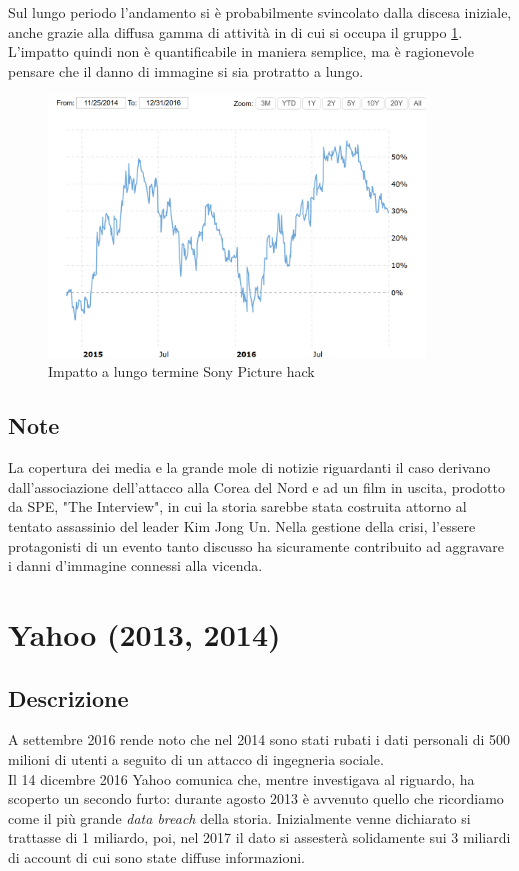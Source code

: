 \documentclass[12pt,a4paper,openright,twoside]{report}
\begin{document}
Sul lungo periodo l'andamento si \`e probabilmente svincolato dalla discesa iniziale, anche  grazie alla diffusa gamma di attivit\`a in di cui si occupa il gruppo \ref{fig:sPic2}. L'impatto quindi non \`e quantificabile in maniera semplice, ma \`e ragionevole pensare che il danno di immagine si sia protratto a lungo.\\
\begin{figure}[H] 
\begin{center} 
\includegraphics[width=10cm]{figures/sony_2014_long.png} 
\caption[Grafico Sony PSN long]{Impatto a lungo termine Sony Picture hack}\label{fig:sPic2}
\end{center}
\end{figure}
\subsection{Note}
La copertura dei media e la grande mole di notizie riguardanti il caso derivano dall'associazione dell'attacco alla Corea del Nord e ad un film in uscita, prodotto da SPE, "The Interview", in cui la storia sarebbe stata costruita attorno al tentato assassinio del leader Kim Jong Un.
Nella gestione della crisi, l'essere protagonisti di un evento tanto discusso ha sicuramente contribuito ad aggravare i danni d'immagine connessi alla vicenda\cite{SonyPic_buzzfeed}.\\

\section{Yahoo (2013, 2014)}
\subsection{Descrizione}
A settembre 2016 rende noto che nel 2014 sono stati rubati i dati personali di 500 milioni di utenti a seguito di un attacco di ingegneria sociale\cite{yahoo_book}.\\
Il 14 dicembre 2016 Yahoo comunica che, mentre investigava al riguardo, ha scoperto un secondo furto: durante agosto 2013 \`e avvenuto quello che ricordiamo come il pi\`u grande \textit{data breach} della storia. Inizialmente venne dichiarato si trattasse di 1 miliardo, poi, nel 2017 il dato si assester\`a solidamente sui 3 miliardi di account di cui sono state diffuse informazioni\cite{yahoo_book}\cite{yahoo_guardian}.
\end{document}
